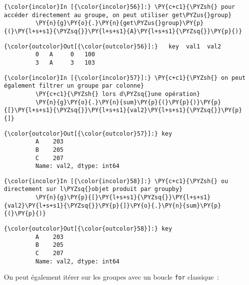     \begin{Verbatim}[commandchars=\\\{\}]
{\color{incolor}In [{\color{incolor}56}]:} \PY{c+c1}{\PYZsh{} pour accéder directement au groupe, on peut utiliser get\PYZus{}group}
         \PY{n}{g}\PY{o}{.}\PY{n}{get\PYZus{}group}\PY{p}{(}\PY{l+s+s1}{\PYZsq{}}\PY{l+s+s1}{A}\PY{l+s+s1}{\PYZsq{}}\PY{p}{)}
\end{Verbatim}


\begin{Verbatim}[commandchars=\\\{\}]
{\color{outcolor}Out[{\color{outcolor}56}]:}   key  val1  val2
         0   A     0   100
         3   A     3   103
\end{Verbatim}
            
    \begin{Verbatim}[commandchars=\\\{\}]
{\color{incolor}In [{\color{incolor}57}]:} \PY{c+c1}{\PYZsh{} on peut également filtrer un groupe par colonne}
         \PY{c+c1}{\PYZsh{} lors d\PYZsq{}une opération}
         \PY{n}{g}\PY{o}{.}\PY{n}{sum}\PY{p}{(}\PY{p}{)}\PY{p}{[}\PY{l+s+s1}{\PYZsq{}}\PY{l+s+s1}{val2}\PY{l+s+s1}{\PYZsq{}}\PY{p}{]}
\end{Verbatim}


\begin{Verbatim}[commandchars=\\\{\}]
{\color{outcolor}Out[{\color{outcolor}57}]:} key
         A    203
         B    205
         C    207
         Name: val2, dtype: int64
\end{Verbatim}
            
    \begin{Verbatim}[commandchars=\\\{\}]
{\color{incolor}In [{\color{incolor}58}]:} \PY{c+c1}{\PYZsh{} ou directement sur l\PYZsq{}objet produit par groupby}
         \PY{n}{g}\PY{p}{[}\PY{l+s+s1}{\PYZsq{}}\PY{l+s+s1}{val2}\PY{l+s+s1}{\PYZsq{}}\PY{p}{]}\PY{o}{.}\PY{n}{sum}\PY{p}{(}\PY{p}{)}
\end{Verbatim}


\begin{Verbatim}[commandchars=\\\{\}]
{\color{outcolor}Out[{\color{outcolor}58}]:} key
         A    203
         B    205
         C    207
         Name: val2, dtype: int64
\end{Verbatim}
            
    On peut également itérer sur les groupes avec un boucle \texttt{for}
classique~:

